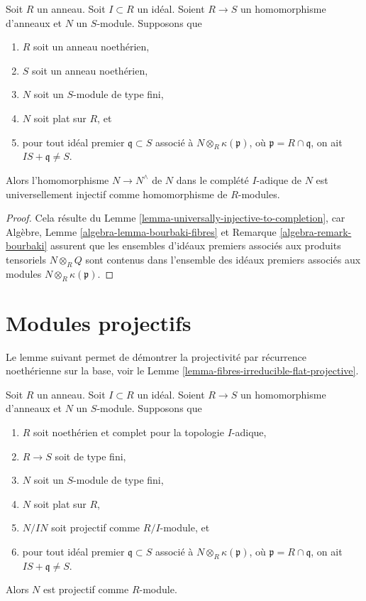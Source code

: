 \begin{lemma}
\label{lemma-universally-injective-to-completion-flat}
Soit $R$ un anneau.
Soit $I \subset R$ un idéal.
Soient $R \to S$ un homomorphisme d'anneaux et $N$ un $S$-module.
Supposons que
\begin{enumerate}
\item $R$ soit un anneau noethérien,
\item $S$ soit un anneau noethérien,
\item $N$ soit un $S$-module de type fini,
\item $N$ soit plat sur $R$, et
\item pour tout idéal premier $\mathfrak q \subset S$ associé à
$N \otimes_R \kappa(\mathfrak p)$, où $\mathfrak p = R \cap \mathfrak q$,
on ait $IS + \mathfrak q \not = S$.
\end{enumerate}
Alors l'homomorphisme $N \to N^\wedge$ de $N$ dans le complété $I$-adique de $N$
est universellement injectif comme homomorphisme de $R$-modules.
\end{lemma}

\begin{proof}
Cela résulte du
Lemme \ref{lemma-universally-injective-to-completion},
car
Algèbre, Lemme
\ref{algebra-lemma-bourbaki-fibres} et
Remarque \ref{algebra-remark-bourbaki}
assurent que les ensembles d'idéaux premiers associés aux produits tensoriels
$N \otimes_R Q$ sont contenus dans l'ensemble des idéaux premiers associés aux
modules $N \otimes_R \kappa(\mathfrak p)$.
\end{proof}




\section{Modules projectifs}
\label{section-projective}

\noindent
Le lemme suivant permet de démontrer la projectivité par
récurrence noethérienne sur la base, voir
le Lemme \ref{lemma-fibres-irreducible-flat-projective}.

\begin{lemma}
\label{lemma-flat-pure-over-complete-projective}
Soit $R$ un anneau.
Soit $I \subset R$ un idéal.
Soient $R \to S$ un homomorphisme d'anneaux et $N$ un $S$-module.
Supposons que
\begin{enumerate}
\item $R$ soit noethérien et complet pour la topologie $I$-adique,
\item $R \to S$ soit de type fini,
\item $N$ soit un $S$-module de type fini,
\item $N$ soit plat sur $R$,
\item $N/IN$ soit projectif comme $R/I$-module, et
\item pour tout idéal premier $\mathfrak q \subset S$ associé à
$N \otimes_R \kappa(\mathfrak p)$, où $\mathfrak p = R \cap \mathfrak q$,
on ait $IS + \mathfrak q \not = S$.
\end{enumerate}
Alors $N$ est projectif comme $R$-module.
\end{lemma}

